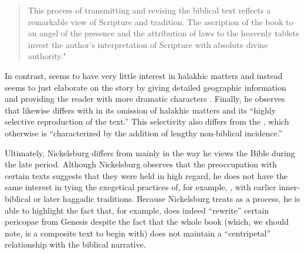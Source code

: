 \begin{quote}
    This process of transmitting and revising the biblical text reflects a remarkable view of Scripture and tradition. The \psgraphic ascription of the book to an angel of the presence and the attribution of laws to the heavenly tablets invest the author's interpretation of Scripture with absolute divine authority."\autocite[101]{nickelsburg_stone1984}
\end{quote} 

In contrast, \ga seems to have very little interest in halakhic matters and instead seems to just elaborate on the story by giving detailed geographic information and providing the reader with more dramatic characters \autocite[106]{nickelsburg_stone1984}. Finally, he observes that \lab likewise differs with \jub in its omission of halakhic matters and its ``highly selective reproduction of the text.''\autocite[110]{nickelsburg_stone1984} This selectivity also differs from the \ga, which otherwise is ``characterized by the addition of lengthy non-biblical incidence.''\autocite[110]{nickelsburg_stone1984} 

Ultimately, Nickelsburg differs from \vermes mainly in the way he views the Bible during the late \secondtemple period. Although Nickelsburg observes that the preoccupation with certain texts suggests that they were held in high regard, he does not have the same interest in tying the exegetical practices of, for example, \jub, with earlier inner-biblical or later haggadic traditions. Because Nickelsburg treats \rwb as a process, he is able to highlight the fact that, for example, \firstenoch does indeed ``rewrite'' certain pericopae from Genesis despite the fact that the whole book (which, we should note, is a composite text to begin with) does not maintain a ``centripetal'' relationship with the biblical narrative. 


